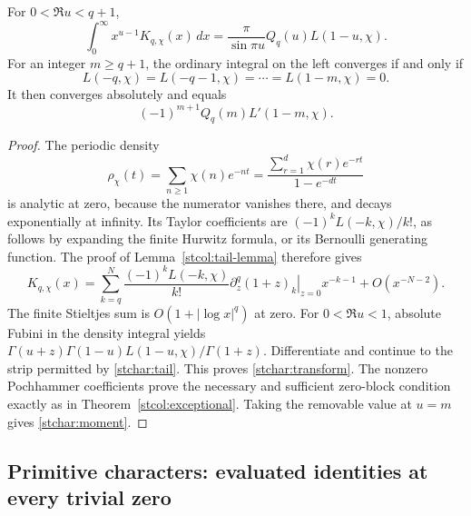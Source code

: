 \begin{theorem}
\label{stchar:mellin}
For $0<\Re u<q+1$,
\begin{equation}\label{stchar:transform}
 \int_0^\infty x^{u-1}K_{q,\chi}(x)\,dx
   =\frac{\pi}{\sin\pi u}Q_q(u)L(1-u,\chi).
\end{equation}
For an integer $m\ge q+1$, the ordinary integral on the left
converges if and only if
\begin{equation}\label{stchar:zero-block}
 L(-q,\chi)=L(-q-1,\chi)=\cdots=L(1-m,\chi)=0.
\end{equation}
It then converges absolutely and equals
\begin{equation}\label{stchar:moment}
 (-1)^{m+1}Q_q(m)L'(1-m,\chi).
\end{equation}
\end{theorem}
\begin{proof}
The periodic density
\[
 \rho_\chi(t)=\sum_{n\ge1}\chi(n)e^{-nt}
       =\frac{\sum_{r=1}^d\chi(r)e^{-rt}}{1-e^{-dt}}
\]
is analytic at zero, because the numerator vanishes there, and
decays exponentially at infinity.  Its Taylor coefficients are
$(-1)^kL(-k,\chi)/k!$, as follows by expanding the finite Hurwitz
formula, or its Bernoulli generating function.  The proof of
Lemma~\ref{stcol:tail-lemma} therefore gives
\begin{equation}\label{stchar:tail}
 K_{q,\chi}(x)
  =\sum_{k=q}^N\frac{(-1)^kL(-k,\chi)}{k!}
       \left.\partial_z^q(1+z)_k\right|_{z=0}x^{-k-1}
       +O(x^{-N-2}).
\end{equation}
The finite Stieltjes sum is $O(1+|\log x|^q)$ at zero.
For $0<\Re u<1$, absolute Fubini in the density integral yields
$\Gamma(u+z)\Gamma(1-u)L(1-u,\chi)/\Gamma(1+z)$.
Differentiate and continue to the strip permitted by
\eqref{stchar:tail}.  This proves \eqref{stchar:transform}.
The nonzero Pochhammer coefficients prove the necessary and sufficient
zero-block condition exactly as in Theorem~\ref{stcol:exceptional}.
Taking the removable value at $u=m$ gives \eqref{stchar:moment}.
\end{proof}

\subsection{Primitive characters: evaluated identities at every trivial zero}

